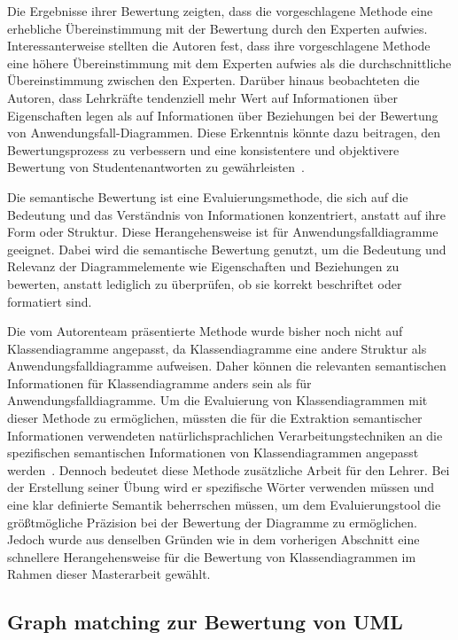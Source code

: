 Die Ergebnisse ihrer Bewertung zeigten, dass die vorgeschlagene Methode eine erhebliche Übereinstimmung mit der
Bewertung durch den Experten aufwies. Interessanterweise stellten die Autoren fest, dass ihre vorgeschlagene Methode
eine höhere Übereinstimmung mit dem Experten aufwies als die durchschnittliche Übereinstimmung zwischen den Experten.
Darüber hinaus beobachteten die Autoren, dass Lehrkräfte tendenziell mehr Wert auf Informationen über Eigenschaften
legen als auf Informationen über Beziehungen bei der Bewertung von Anwendungsfall-Diagrammen. Diese Erkenntnis könnte
dazu beitragen, den Bewertungsprozess zu verbessern und eine konsistentere und objektivere Bewertung von
Studentenantworten zu gewährleisten~\cite{fauzan2021different}.

Die semantische Bewertung ist eine Evaluierungsmethode, die sich auf die Bedeutung und das Verständnis von
Informationen konzentriert, anstatt auf ihre Form oder Struktur. Diese Herangehensweise ist für Anwendungsfalldiagramme
geeignet. Dabei wird die semantische Bewertung genutzt, um die Bedeutung und Relevanz der Diagrammelemente wie
Eigenschaften und Beziehungen zu bewerten, anstatt lediglich zu überprüfen, ob sie korrekt beschriftet oder formatiert sind.


Die vom Autorenteam präsentierte Methode wurde bisher noch nicht auf Klassendiagramme angepasst, da Klassendiagramme
eine andere Struktur als Anwendungsfalldiagramme aufweisen. Daher können die relevanten semantischen Informationen für
Klassendiagramme anders sein als für Anwendungsfalldiagramme. Um die Evaluierung von Klassendiagrammen mit dieser
Methode zu ermöglichen, müssten die für die Extraktion semantischer Informationen verwendeten natürlichsprachlichen
Verarbeitungstechniken an die spezifischen semantischen Informationen von Klassendiagrammen angepasst werden~\cite{fauzan2021different}. Dennoch
bedeutet diese Methode zusätzliche Arbeit für den Lehrer. Bei der Erstellung seiner Übung wird er spezifische Wörter
verwenden müssen und eine klar definierte Semantik beherrschen müssen, um dem Evaluierungstool die größtmögliche
Präzision bei der Bewertung der Diagramme zu ermöglichen. Jedoch wurde aus denselben Gründen wie in dem vorherigen
Abschnitt eine schnellere Herangehensweise für die Bewertung von Klassendiagrammen im Rahmen dieser Masterarbeit gewählt.


\subsection{Graph matching zur Bewertung von UML}

